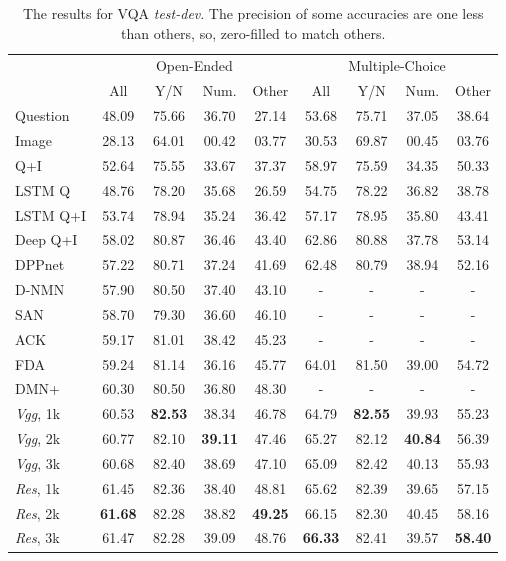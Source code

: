 \begin{table}[h]
\caption{The results for VQA \textit{test-dev}. The precision of some accuracies \cite{Yang2015,Andreas2016,Xiong2016} are one less than others, so, zero-filled to match others.}
\label{tab:results}
\centering
\begin{tabular}{lcccccccc}
\toprule
& \multicolumn{4}{c}{Open-Ended} & \multicolumn{4}{c}{Multiple-Choice}\\
\cmidrule{2-5}
\cmidrule{6-9}
 & All & Y/N & Num. & Other & All & Y/N & Num. & Other\\
\midrule
Question \cite{Antol2015} 
         & 48.09 & 75.66 &  36.70& 27.14 
         & 53.68 & 75.71 & 37.05 & 38.64\\
Image \cite{Antol2015}   
         & 28.13 & 64.01 & 00.42 & 03.77  
         & 30.53 & 69.87 & 00.45 & 03.76\\
Q+I  \cite{Antol2015}     
         & 52.64 & 75.55 & 33.67 & 37.37 
         & 58.97 & 75.59 & 34.35 & 50.33\\
LSTM Q \cite{Antol2015}   
         & 48.76 & 78.20 & 35.68 & 26.59 
         & 54.75 & 78.22 & 36.82 &38.78\\
LSTM Q+I \cite{Antol2015} 
         & 53.74 & 78.94 & 35.24 & 36.42 
         & 57.17 & 78.95& 35.80 & 43.41\\
Deep Q+I \cite{Lu2015}
         & 58.02 & 80.87 & 36.46 & 43.40 
         & 62.86 & 80.88 & 37.78 & 53.14\\
\midrule
DPPnet \cite{Noh2015}
         & 57.22 & 80.71 & 37.24 & 41.69
         & 62.48 & 80.79 & 38.94 & 52.16\\
D-NMN \cite{Andreas2016}
         & 57.90 & 80.50 & 37.40 & 43.10
         & - & - & - & - \\
SAN    \cite{Yang2015}
         & 58.70 & 79.30 & 36.60 & 46.10
         & - & - & - & - \\
ACK    \cite{Wu2016}
         & 59.17 & 81.01 & 38.42 & 45.23
         & - & - & - & - \\
FDA    \cite{Ilievski2016}
         & 59.24 & 81.14 & 36.16 & 45.77
         & 64.01 & 81.50 & 39.00 & 54.72\\
DMN+ \cite{Xiong2016}
         & 60.30 & 80.50 & 36.80 & 48.30
         & - & - & - & - \\
\midrule
  \textit{Vgg}, 1k & 
     60.53 & \textbf{82.53} & 38.34 & 46.78 & 64.79 & \textbf{82.55} & 39.93 & 55.23 \\
  \textit{Vgg}, 2k & 
     60.77 & 82.10 & \textbf{39.11} & 47.46 & 65.27 & 82.12 & \textbf{40.84} & 56.39 \\
  \textit{Vgg}, 3k & 
     60.68 & 82.40 & 38.69 & 47.10 & 65.09 & 82.42 & 40.13 & 55.93 \\
  \textit{Res}, 1k & 
     61.45 & 82.36 & 38.40 & 48.81 & 65.62 & 82.39 & 39.65 & 57.15 \\
  \textit{Res}, 2k & 
     \textbf{61.68} & 82.28 & 38.82 & \textbf{49.25} & 66.15 & 82.30 & 40.45 &58.16 \\
  \textit{Res}, 3k & 61.47 & 82.28 & 39.09 & 48.76 & \textbf{66.33} & 82.41 &  39.57 & \textbf{58.40} \\
\bottomrule
\end{tabular}
\end{table}

